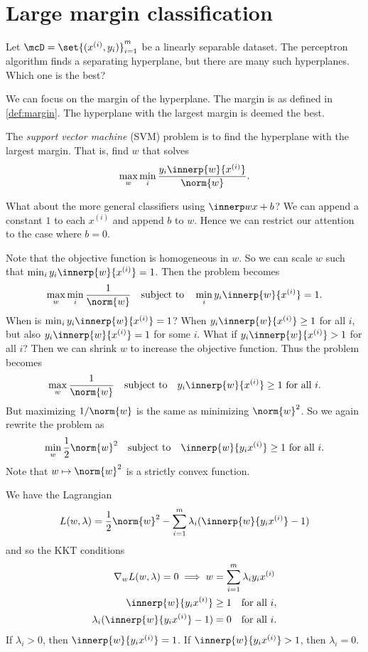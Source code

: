 \chapter{Large margin classification} \label{chp:svm}
Let $\mcD = \set{(x^{(i)}, y_i)}_{i=1}^m$ be a linearly separable dataset.
The perceptron algorithm finds a separating hyperplane,
but there are many such hyperplanes.
Which one is the best?

We can focus on the margin of the hyperplane.
The margin is as defined in \cref{def:margin}.
The hyperplane with the largest margin is deemed the best.

\begin{definition*} \label{def:svm}
    The \emph{support vector machine} (SVM) problem is to find the
    hyperplane with the largest margin.
    That is, find $w$ that solves \[
        \max_w \min_i \frac{y_i \innerp{w}{x^{(i)}}}{\norm{w}}.
    \]
\end{definition*}
What about the more general classifiers using $\innerp w x + b$?
We can append a constant $1$ to each $x^{(i)}$ and append $b$ to $w$.
Hence we can restrict our attention to the case where $b = 0$.

Note that the objective function is homogeneous in $w$.
So we can scale $w$ such that $\min_i y_i \innerp{w}{x^{(i)}} = 1$.
Then the problem becomes \[
    \max_w \min_i \frac1{\norm{w}} \quad \text{subject to} \quad
    \min_i y_i \innerp{w}{x^{(i)}} = 1.
\] When is $\min_i y_i \innerp{w}{x^{(i)}} = 1$?
When $y_i \innerp{w}{x^{(i)}} \ge 1$ for all $i$, but also
$y_i \innerp{w}{x^{(i)}} = 1$ for some $i$.
What if $y_i \innerp{w}{x^{(i)}} > 1$ for all $i$?
Then we can shrink $w$ to increase the objective function.
Thus the problem becomes \[
    \max_w \frac1{\norm{w}} \quad \text{subject to} \quad
    y_i \innerp{w}{x^{(i)}} \ge 1 \text{ for all } i.
\] But maximizing $1/\norm{w}$ is the same as minimizing $\norm{w}^2$.
So we again rewrite the problem as \[
    \min_w \frac12 \norm{w}^2 \quad \text{subject to} \quad
    \innerp{w}{y_i x^{(i)}} \ge 1 \text{ for all } i.
\] Note that $w \mapsto \norm{w}^2$ is a strictly convex function.

We have the Lagrangian \[
    L(w, \lambda) = \frac12 \norm{w}^2
        - \sum_{i=1}^m \lambda_i (\innerp{w}{y_i x^{(i)}} - 1)
\] and so the KKT conditions \begin{align}
    \nabla_w L(w, \lambda) = 0 \implies
        w &= \sum_{i=1}^m \lambda_i y_i x^{(i)} \label{eq:svm-w} \\
    \innerp{w}{y_i x^{(i)}} &\ge 1 \quad \text{for all } i, \\
    \lambda_i (\innerp{w}{y_i x^{(i)}} - 1) &= 0 \quad \text{for all } i.
\end{align}
If $\lambda_i > 0$, then $\innerp{w}{y_i x^{(i)}} = 1$.
If $\innerp{w}{y_i x^{(i)}} > 1$, then $\lambda_i = 0$.

